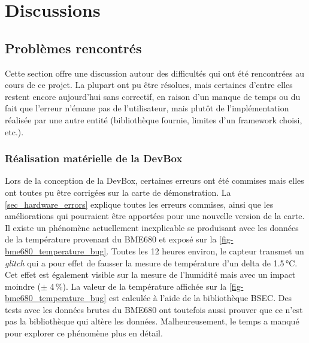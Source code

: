 \chapter{Discussions}

\section{Problèmes rencontrés}

Cette section offre une discussion autour des difficultés qui ont été rencontrées au cours de ce projet. La plupart ont pu être résolues, mais certaines d'entre elles restent encore aujourd'hui sans correctif, en raison d'un manque de temps ou du fait que l'erreur n'émane pas de l'utilisateur, mais plutôt de l'implémentation réalisée par une autre entité (bibliothèque fournie, limites d'un framework choisi, etc.). 

\subsection{Réalisation matérielle de la DevBox}

Lors de la conception de la DevBox, certaines erreurs ont été commises mais elles ont toutes pu être corrigées sur la carte de démonstration. La \cref{sec_hardware_errors} explique toutes les erreurs commises, ainsi que les améliorations qui pourraient être apportées pour une nouvelle version de la carte. \\

Il existe un phénomène actuellement inexplicable se produisant avec les données de la température provenant du BME680 et exposé sur la \cref{fig-bme680_temperature_bug}. Toutes les 12 heures environ, le capteur transmet un \textit{glitch} qui a pour effet de fausser la mesure de température d'un delta de 1.5\,°C. Cet effet est également visible sur la mesure de l'humidité mais avec un impact moindre ($\pm$ 4\,\%). La valeur de la température affichée sur la \cref{fig-bme680_temperature_bug} est calculée à l'aide de la bibliothèque BSEC. Des tests avec les données brutes du BME680 ont toutefois aussi prouver que ce n'est pas la bibliothèque qui altère les données. Malheureusement, le temps a manqué pour explorer ce phénomène plus en détail.

